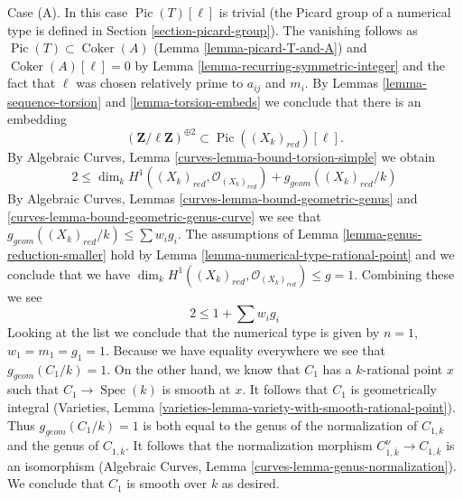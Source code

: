 \documentclass{stacks-project}
\theoremstyle{plain}
\theoremstyle{definition}
\theoremstyle{remark}
\numberwithin{equation}{subsection}
\def\Spec{\mathop{\mathrm{Spec}}}
\def\Coker{\mathop{\mathrm{Coker}}}
\def\Pic{\mathop{\mathrm{Pic}}\nolimits}
\begin{document}
\medskip\noindent
Case (A). In this case $\Pic(T)[\ell]$ is trivial (the Picard group
of a numerical type is defined in Section \ref{section-picard-group}).
The vanishing follows as $\Pic(T) \subset \Coker(A)$
(Lemma \ref{lemma-picard-T-and-A}) and $\Coker(A)[\ell] = 0$ by
Lemma \ref{lemma-recurring-symmetric-integer} and the
fact that $\ell$ was chosen relatively prime to $a_{ij}$ and $m_i$.
By Lemmas \ref{lemma-sequence-torsion} and \ref{lemma-torsion-embeds}
we conclude that there is an embedding
$$
(\mathbf{Z}/\ell \mathbf{Z})^{\oplus 2} \subset \Pic((X_k)_{red})[\ell].
$$
By Algebraic Curves, Lemma \ref{curves-lemma-bound-torsion-simple} we obtain
$$
2 \leq \dim_k H^1((X_k)_{red}, \mathcal{O}_{(X_k)_{red}}) +
g_{geom}((X_k)_{red}/k)
$$
By Algebraic Curves, Lemmas \ref{curves-lemma-bound-geometric-genus} and
\ref{curves-lemma-bound-geometric-genus-curve}
we see that $g_{geom}((X_k)_{red}/k) \leq \sum w_ig_i$.
The assumptions of Lemma \ref{lemma-genus-reduction-smaller}
hold by Lemma \ref{lemma-numerical-type-rational-point} and we
conclude that we have
$\dim_k H^1((X_k)_{red}, \mathcal{O}_{(X_k)_{red}}) \leq g = 1$.
Combining these we see
$$
2 \leq 1 + \sum w_i g_i
$$
Looking at the list we conclude that the numerical type is given by
$n = 1$, $w_1 = m_1 = g_1 = 1$. Because we have equality everywhere
we see that $g_{geom}(C_1/k) = 1$. On the other hand, we know
that $C_1$ has a $k$-rational point $x$ such that $C_1 \to \Spec(k)$
is smooth at $x$. It follows that $C_1$ is geometrically integral
(Varieties, Lemma \ref{varieties-lemma-variety-with-smooth-rational-point}).
Thus $g_{geom}(C_1/k) = 1$ is both equal to the genus of the normalization
of $C_{1, \overline{k}}$ and the genus of $C_{1, \overline{k}}$.
It follows that the normalization morphism
$C_{1, \overline{k}}^\nu \to C_{1, \overline{k}}$
is an isomorphism
(Algebraic Curves, Lemma \ref{curves-lemma-genus-normalization}).
We conclude that $C_1$ is smooth over $k$ as desired.
\end{document}
